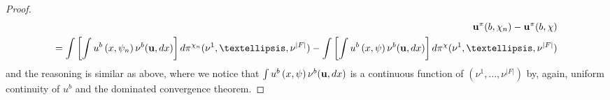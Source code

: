 \documentclass[10pt,a4paper]{amsart}
\begin{document}
\begin{proof}
\begin{eqnarray*}
\bold{u}^{\pi}(b,\chi_n) - \bold{u}^{\pi}(b,\chi)\\ =    
\int \left[\int u^{b}\left(x, \psi_n \right) \nu^b(\bold{u},dx)\right] d\pi^{\chi_n}(\nu^1,\dots,\nu^{|F|}) - \int \left[\int u^{b}\left(x, \psi \right) \nu^b(\bold{u},dx)\right] d\pi^{\chi}(\nu^1,\dots,\nu^{|F|}) 
\end{eqnarray*}
and the reasoning is similar as above, where we notice that $\int u^{b}\left(x, \psi \right) \nu^b(\bold{u},dx)$ is a continuous function of $(\nu^1,\dots,\nu^{|F|})$ by, again, uniform continuity of $u^b$ and the dominated convergence theorem. 
\end{proof}
\end{document}
